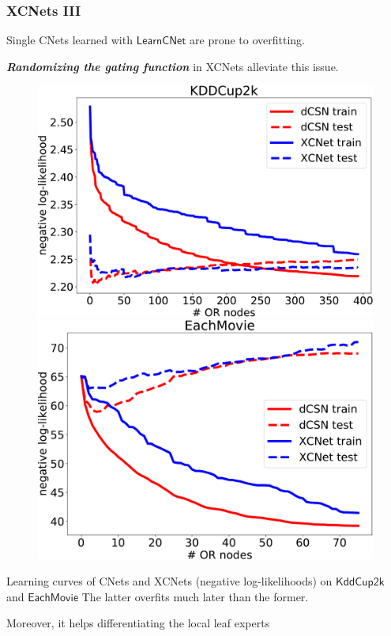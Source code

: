 \documentclass[xcolor={usenames,dvipsnames,svgnames}, compress]{beamer}
\begin{document}
\begin{frame}[t]
  \frametitle{XCNets III}
  \small
  Single CNets learned with $\mathsf{LearnCNet}$ are prone to
  overfitting.\par
  \textbf{\emph{Randomizing the gating function}} in \textsf{XCNets} alleviate this issue.
   \vspace{10pt} 
\begin{figure}[t]
  \label{fig:ll}
  \centering
    \includegraphics[width=0.42\linewidth]{figures/kdd-crop} \hspace{20pt}
    \includegraphics[width=0.41\linewidth]{figures/tmovie-crop}
\end{figure}
\hspace{30pt}
\begin{minipage}{0.8\linewidth}
  \vspace{-10pt}
\tiny  Learning curves of CNets and XCNets (negative
log-likelihoods) on $\mathsf{KddCup2k}$ and $\mathsf{EachMovie}$
The latter overfits much later than the former.
\end{minipage}\par
\vspace{10pt}
Moreover, it helps differentiating the local leaf experts 
\end{frame}
\end{document}
